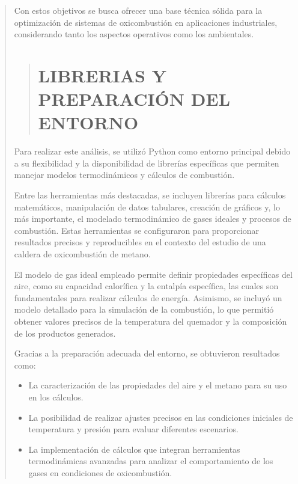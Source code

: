 \documentclass[11pt, a4paper]{article}
\begin{document}
\begin{quote}
\begin{center}
\begin{adjustwidth}{-1.7cm}{-1cm}
Con estos objetivos se busca ofrecer una base técnica sólida para la optimización de sistemas de oxicombustión en aplicaciones industriales, considerando tanto los aspectos operativos como los ambientales.


\newpage

\begin{quote}
\setlength{\parskip}{1pt} %
\vspace*{0.3cm} %
\hypertarget{libyentorno}{%
\section{LIBRERIAS Y PREPARACIÓN DEL ENTORNO}\label{libyentorno}}
\end{quote}
\vspace*{1cm} %

Para realizar este análisis, se utilizó Python como entorno principal debido a su flexibilidad y la disponibilidad de librerías específicas que permiten manejar modelos termodinámicos y cálculos de combustión. 

Entre las herramientas más destacadas, se incluyen librerías para cálculos matemáticos, manipulación de datos tabulares, creación de gráficos y, lo más importante, el modelado termodinámico de gases ideales y procesos de combustión. Estas herramientas se configuraron para proporcionar resultados precisos y reproducibles en el contexto del estudio de una caldera de oxicombustión de metano.

El modelo de gas ideal empleado permite definir propiedades específicas del aire, como su capacidad calorífica y la entalpía específica, las cuales son fundamentales para realizar cálculos de energía. Asimismo, se incluyó un modelo detallado para la simulación de la combustión, lo que permitió obtener valores precisos de la temperatura del quemador y la composición de los productos generados.

Gracias a la preparación adecuada del entorno, se obtuvieron resultados como:
\begin{itemize}
    \item La caracterización de las propiedades del aire y el metano para su uso en los cálculos.
    \item La posibilidad de realizar ajustes precisos en las condiciones iniciales de temperatura y presión para evaluar diferentes escenarios.
    \item La implementación de cálculos que integran herramientas termodinámicas avanzadas para analizar el comportamiento de los gases en condiciones de oxicombustión.
\end{itemize}


\end{adjustwidth}
\end{center}
\end{quote}
\end{document}
